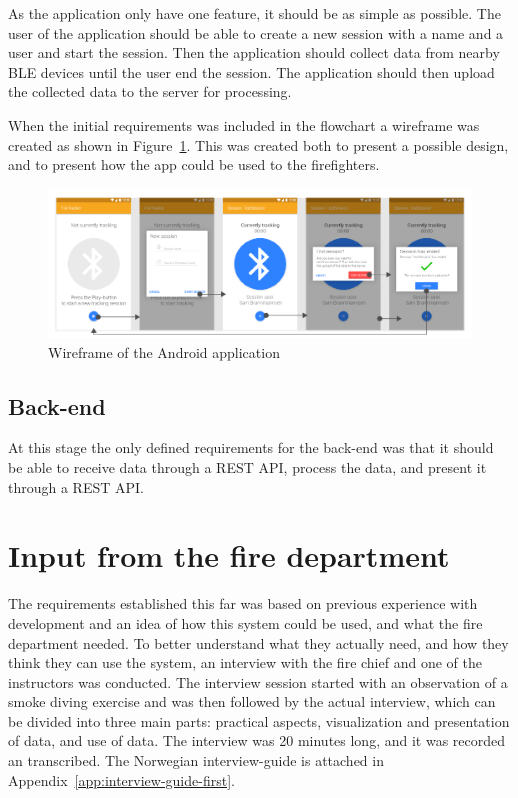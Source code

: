 \documentclass[../Main/thesis.tex]{subfiles}
\begin{document}
As the application only have one feature, it should be as simple as possible. 
The user of the application should be able to create a new session with a name and a user and start the session. 
Then the application should collect data from nearby BLE devices until the user end the session.
The application should then upload the collected data to the server for processing.

When the initial requirements was included in the flowchart a wireframe was created as shown in Figure~\ref{fig:wireframe-app-1}.
This was created both to present a possible design, and to present how the app could be used to the firefighters. 

\begin{figure}
	\centering
	\includegraphics[width=\linewidth]{../fig/wireframe_app_1}
	\caption{Wireframe of the Android application}
	\label{fig:wireframe-app-1}
\end{figure}

\subsection{Back-end}
At this stage the only defined requirements for the back-end was that it should be able to receive data through a REST API, process the data, and present it through a REST API.

\section{Input from the fire department}
The requirements established this far was based on previous experience with development and an idea of how this system could be used, and what the fire department needed.
To better understand what they actually need, and how they think they can use the system, an interview with the fire chief and one of the instructors was conducted.
The interview session started with an observation of a smoke diving exercise and was then followed by the actual interview, which can be divided into three main parts: practical aspects, visualization and presentation of data, and use of data.
The interview was 20 minutes long, and it was recorded an transcribed.
The Norwegian interview-guide is attached in Appendix~\ref{app:interview-guide-first}.
\end{document}
